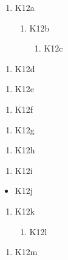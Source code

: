 \documentclass[12pt]{article}
\newlength{\mylen}
\newlength{\fixlen}
\begin{document}
\begin{enumerate}[label=\arabic*.]
\item K12a
\begin{enumerate}[label=(\alph*)]
\item K12b
\begin{enumerate}[label=\roman*.,itemsep=0pt]
\item K12c
\end{enumerate}
\end{enumerate}
\end{enumerate}
\begin{enumerate}[labelsep=1em]
\item K12d
\end{enumerate}
\begin{enumerate}[itemindent=1em]
\item K12e
\end{enumerate}
\begin{enumerate}[label=\roman*.,leftmargin=*,widest=iii]
\item K12f
\end{enumerate}
\begin{enumerate}[leftmargin=\mylen]
\item K12g
\end{enumerate}
\begin{enumerate}[leftmargin=*,labelsep=1em]
\item K12h
\end{enumerate}
\begin{enumerate}[leftmargin=*,itemindent=6pt]
\item K12i
\end{enumerate}
\begin{itemize}[leftmargin=*,widest=WW]
\item K12j
\end{itemize}
\begin{enumerate}[leftmargin=*,labelsep=2em]
\item K12k
\begin{enumerate}[leftmargin=*]
\item K12l
\end{enumerate}
\end{enumerate}
\begin{enumerate}[leftmargin=\fixlen]
\item K12m
\end{enumerate}
\end{document}
